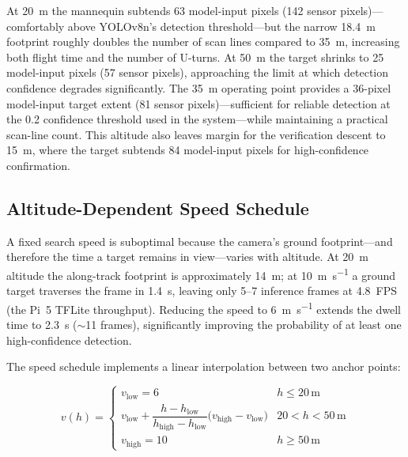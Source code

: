 At \SI{20}{\metre} the mannequin subtends 63 model-input pixels (142 sensor pixels)---comfortably above YOLOv8n's detection threshold---but the narrow \SI{18.4}{\metre} footprint roughly doubles the number of scan lines compared to \SI{35}{\metre}, increasing both flight time and the number of U-turns.  At \SI{50}{\metre} the target shrinks to 25 model-input pixels (57 sensor pixels), approaching the limit at which detection confidence degrades significantly.  The \SI{35}{\metre} operating point provides a 36-pixel model-input target extent (81 sensor pixels)---sufficient for reliable detection at the 0.2 confidence threshold used in the system---while maintaining a practical scan-line count.  This altitude also leaves margin for the verification descent to \SI{15}{\metre}, where the target subtends 84 model-input pixels for high-confidence confirmation.

\subsection{Altitude-Dependent Speed Schedule}\label{sec:speed-schedule}

A fixed search speed is suboptimal because the camera's ground footprint---and therefore the time a target remains in view---varies with altitude.  At \SI{20}{\metre} altitude the along-track footprint is approximately \SI{14}{\metre}; at \SI{10}{\metre\per\second} a ground target traverses the frame in \SI{1.4}{\second}, leaving only 5--7 inference frames at \SI{4.8}{FPS} (the Pi~5 TFLite throughput).  Reducing the speed to \SI{6}{\metre\per\second} extends the dwell time to \SI{2.3}{\second} ($\sim$11 frames), significantly improving the probability of at least one high-confidence detection.

The speed schedule implements a linear interpolation between two anchor points:

\begin{equation}\label{eq:speed-schedule}
  v(h) = \begin{cases}
    v_{\text{low}} = 6 & h \leq 20\,\text{m} \\[4pt]
    v_{\text{low}} + \dfrac{h - h_{\text{low}}}{h_{\text{high}} - h_{\text{low}}} \bigl(v_{\text{high}} - v_{\text{low}}\bigr) & 20 < h < 50\,\text{m} \\[4pt]
    v_{\text{high}} = 10 & h \geq 50\,\text{m}
  \end{cases}
\end{equation}

